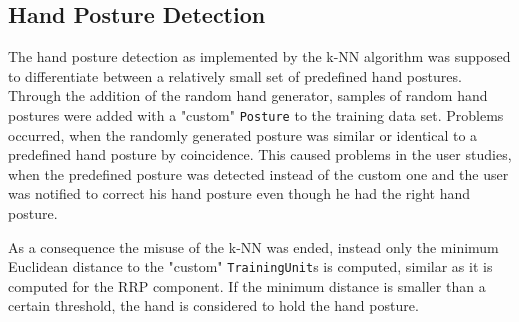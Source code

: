 \subsection{Hand Posture Detection}

The hand posture detection as implemented by the k-NN algorithm was supposed to differentiate between a relatively small set of predefined hand postures. Through the addition of the random hand generator, samples of random hand postures were added with a "custom" \texttt{Posture} to the training data set. Problems occurred, when the randomly generated posture was similar or identical to a predefined hand posture by coincidence. This caused problems in the user studies, when the predefined posture was detected instead of the custom one and the user was notified to correct his hand posture even though he had the right hand posture. 

As a consequence the misuse of the k-NN was ended, instead only the minimum Euclidean distance to the "custom" \texttt{TrainingUnit}s is computed, similar as it is computed for the RRP component. If the minimum distance is smaller than a certain threshold, the hand is considered to hold the hand posture.